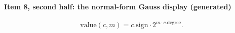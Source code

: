 \paragraph{Item 8, second half: the normal-form Gauss display (generated)}
\[\mathrm{value}(c,m)=c.\mathrm{sign}\cdot 2^{m\cdot c.\mathrm{degree}}.\]
